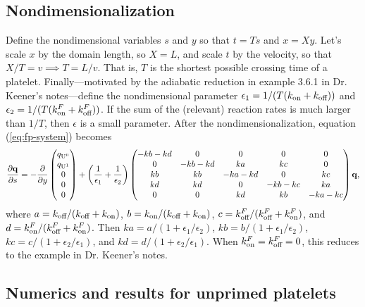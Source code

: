 \documentclass{article}
\newcommand{\tn}{\textnormal}
\newcommand{\Pder}[2]{\frac{\partial #1}{\partial #2}}
\begin{document}
\subsection{Nondimensionalization}
\label{sec:nondim}

Define the nondimensional variables $s$ and $y$ so that $t = Ts$ and
$x = Xy$. Let's scale $x$ by the domain length, so $X = L$, and scale
$t$ by the velocity, so that $X/T = v \implies T = L/v$. That is, $T$
is the shortest possible crossing time of a
platelet. Finally---motivated by the adiabatic reduction in example
3.6.1 in Dr. Keener's notes---define the nondimensional parameter
$\epsilon_1 = 1/(T(k_\tn{on} + k_\tn{off}))$ and
$\epsilon_2 = 1/(T(k_\tn{on}^F + k_\tn{off}^F))$. If the sum of the
(relevant) reaction rates is much larger than $1/T$, then $\epsilon$
is a small parameter. After the nondimensionalization, equation
(\ref{eq:fp-system}) becomes
\begin{equation}
  \label{eq:nd-system}
  \Pder{\mathbf{q}}{s} = -\Pder{}{y}
  \begin{pmatrix}
    q_{\tn{U}^0} \\ q_{\tn{U}^1} \\ 0 \\ 0 \\ 0
  \end{pmatrix}
  + \left(\frac{1}{\epsilon_1} + \frac{1}{\epsilon_2}\right)
  \begin{pmatrix}
    - kb - kd & 0 & 0 & 0 & 0 \\
    0 & - kb - kd & ka & kc & 0 \\
    kb & kb & - ka - kd & 0 & kc \\
    kd & kd & 0 & - kb - kc & ka \\
    0 & 0 & kd & kb & - ka - kc
  \end{pmatrix}
  \mathbf{q},
\end{equation}
where $a = k_\tn{off}/(k_\tn{off} + k_\tn{on})$,
$b = k_\tn{on}/(k_\tn{off} + k_\tn{on})$,
$c = k_\tn{off}^F/(k_\tn{off}^F + k_\tn{on}^F)$, and
$d = k_\tn{on}^F/(k_\tn{off}^F + k_\tn{on}^F)$. Then
$ka = a/(1 + \epsilon_1/\epsilon_2)$,
$kb = b/(1 + \epsilon_1/\epsilon_2)$,
$kc = c/(1 + \epsilon_2/\epsilon_1)$, and
$kd = d/(1 + \epsilon_2/\epsilon_1)$. When
$k_\tn{on}^F = k_\tn{off}^F = 0$, this reduces to the example in
Dr. Keener's notes.

\subsection{Numerics and results for unprimed platelets}
\label{sec:res-unpr}
\end{document}
